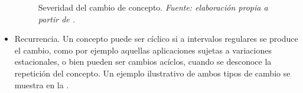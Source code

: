 \documentclass[c5paper,10pt,twoside]{book}	   	%
\begin{document}
\begin{itemize}
	\begin{figure}[!hbtp]
		\centering
		\caption[Severidad del cambio de concepto]{Severidad del cambio de concepto. \textit{Fuente: elaboración propia a partir de \cite{Kshg18}.}}
		\label{fig:severidadCambio}
	\end{figure}
	
	\item Recurrencia. Un concepto puede ser cíclico si a intervalos regulares se produce el cambio, como por ejemplo aquellas aplicaciones sujetas a variaciones estacionales, o bien pueden ser cambios acíclos, cuando se desconoce la repetición del concepto. Un ejemplo ilustrativo de ambos tipos de cambio se muestra en la .
	

\end{itemize}
\end{document}
